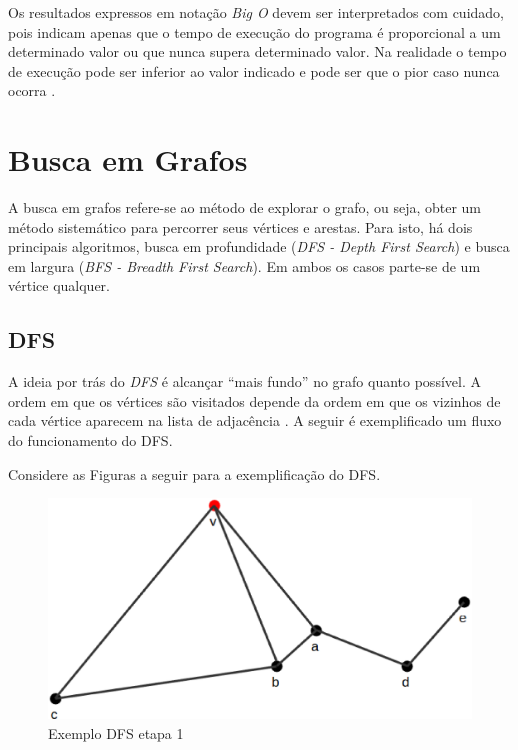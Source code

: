 \begin{apendicesenv}
Os resultados expressos em notação \textit{Big O} devem ser interpretados com cuidado, pois indicam apenas que o tempo de execução do programa é proporcional a um determinado valor ou que nunca supera determinado valor. Na realidade o tempo de execução pode ser inferior ao valor indicado e pode ser que o pior caso nunca ocorra \cite{Junior:2014}.

\section{Busca em Grafos}

A busca em grafos refere-se ao método de explorar o grafo, ou seja, obter um método sistemático para percorrer seus vértices e arestas. Para isto, há dois principais algoritmos, busca em profundidade (\textit{DFS - Depth First Search}) e busca em largura (\textit{BFS - Breadth First Search}). Em ambos os casos parte-se de um vértice qualquer.

\subsection{DFS}
\label{subsec:dfs}

A ideia por trás do \textit{DFS} é alcançar ``mais fundo'' no grafo quanto possível. A ordem em que os vértices são visitados depende da ordem em que os vizinhos de cada vértice aparecem na lista de adjacência \cite{Cormen:2001}. A seguir é exemplificado um fluxo do funcionamento do DFS.

Considere as Figuras a seguir para a exemplificação do DFS.

\begin{figure}[!h]
	\centering
	\includegraphics[scale=0.25]{figuras/capitulo2/dfs/dfs1.eps}
	\caption[Exemplo DFS etapa 1]{Exemplo DFS etapa 1 \cite{Cormen:2001}}
	\label{dfs1}
\end{figure}


\end{apendicesenv}
